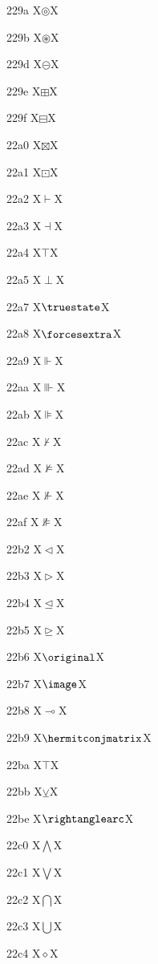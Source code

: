 \documentclass[11pt]{article}
\begin{document}
229a X{\ensuremath{\circledcirc}}X

229b X{\ensuremath{\circledast}}X

229d X{\ensuremath{\circleddash}}X

229e X{\ensuremath{\boxplus}}X

229f X{\ensuremath{\boxminus}}X

22a0 X{\ensuremath{\boxtimes}}X

22a1 X{\ensuremath{\boxdot}}X

22a2 X{\ensuremath{\vdash}}X

22a3 X{\ensuremath{\dashv}}X

22a4 X{\ensuremath{\top}}X

22a5 X{\ensuremath{\perp}}X

22a7 X{\ensuremath{\truestate}}X

22a8 X{\ensuremath{\forcesextra}}X

22a9 X{\ensuremath{\Vdash}}X

22aa X{\ensuremath{\Vvdash}}X

22ab X{\ensuremath{\VDash}}X

22ac X{\ensuremath{\nvdash}}X

22ad X{\ensuremath{\nvDash}}X

22ae X{\ensuremath{\nVdash}}X

22af X{\ensuremath{\nVDash}}X

22b2 X{\ensuremath{\vartriangleleft}}X

22b3 X{\ensuremath{\vartriangleright}}X

22b4 X{\ensuremath{\trianglelefteq}}X

22b5 X{\ensuremath{\trianglerighteq}}X

22b6 X{\ensuremath{\original}}X

22b7 X{\ensuremath{\image}}X

22b8 X{\ensuremath{\multimap}}X

22b9 X{\ensuremath{\hermitconjmatrix}}X

22ba X{\ensuremath{\intercal}}X

22bb X{\ensuremath{\veebar}}X

22be X{\ensuremath{\rightanglearc}}X

22c0 X{\ensuremath{\bigwedge}}X

22c1 X{\ensuremath{\bigvee}}X

22c2 X{\ensuremath{\bigcap}}X

22c3 X{\ensuremath{\bigcup}}X

22c4 X{\ensuremath{\diamond}}X
\end{document}
